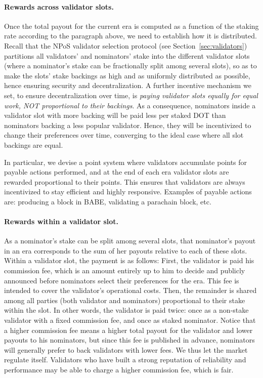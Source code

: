 \paragraph{Rewards across validator slots.} Once the total payout for the current era is computed 
as a function of the staking rate according to the paragraph above, we need to establish how it is distributed.
Recall that the NPoS validator selection protocol (see Section~\ref{sec:validators}) 
partitions all validators' and nominators' stake into the different validator slots 
(where a nominator's stake can be fractionally split among several slots), so as to make the slots' 
stake backings as high and as uniformly distributed as possible, hence ensuring security and decentralization. 
A further incentive mechanism we set, to ensure decentralization over time, 
is \emph{paying validator slots equally for equal work, NOT proportional to their backings}. 
As a consequence, nominators inside a validator slot with more backing will be paid less per staked DOT 
than nominators backing a less popular validator. Hence, they will be incentivized to change 
their preferences over time, converging to the ideal case where all slot backings are equal.

In particular, we devise a point system where validators accumulate points for payable actions performed, 
and at the end of each era validator slots are rewarded proportional to their points. 
This ensures that validators are always incentivized to stay efficient and highly responsive.
Examples of payable actions are: producing a block in BABE, validating a parachain block, etc.

\paragraph{Rewards within a validator slot.} As a nominator's stake can be split among several slots, 
that nominator's payout in an era corresponds to the sum of her payouts relative to each of these slots. 
Within a validator slot, the payment is as follows: 
First, the validator is paid his commission fee, which is an amount entirely up to him to decide and 
publicly announced before nominators select their preferences for the era. 
This fee is intended to cover the validator's operational costs. 
Then, the remainder is shared among all parties (both validator and nominators) proportional to their stake within the slot. 
In other words, the validator is paid twice: once as a non-stake validator with a fixed commission fee, and once as staked nominator. 
Notice that a higher commission fee means a higher total payout for the validator and lower payouts to his nominators, 
but since this fee is published in advance, nominators will generally prefer to back validators with lower fees. 
We thus let the market regulate itself. Validators who have built a strong reputation of reliability and performance 
may be able to charge a higher commission fee, which is fair.

